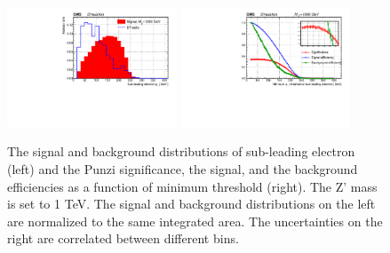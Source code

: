 \begin{figure}[htbp]
   \centering
   \includegraphics[width=0.45\textwidth]{optimization/plot_2nd_pt/plot_2nd_pt_input_in_Zprime_mass_1000.pdf}
   \includegraphics[width=0.45\textwidth]{optimization/plot_2nd_pt/plot_2nd_pt_Significance_and_efficiency_for_Zprme_M_1000.pdf}
   \caption{The signal and background distributions of sub-leading electron \pt 
(left) and the Punzi significance, the signal, and the background efficiencies as a 
 function of minimum \pt threshold (right). The Z' mass is set to 1 TeV. The 
   signal and background distributions on the left are normalized to the same 
   integrated area. The uncertainties on the right are correlated between 
 different bins.}
   \label{fig:subptone}
\end{figure}


